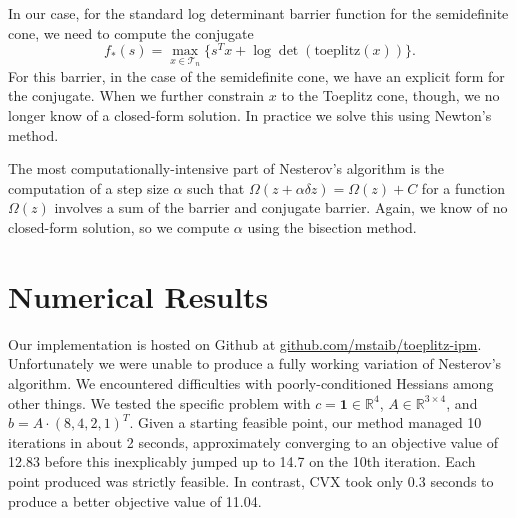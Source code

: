 \documentclass{article}
\begin{document}
In our case, for the standard log determinant barrier function for the semidefinite cone, we need to compute the conjugate
\begin{equation}
f_*(s) = \max_{x \in \mathcal T_n} \{ s^T x + \log\det(\text{toeplitz}(x))\}.
\end{equation}
For this barrier, in the case of the semidefinite cone, we have an explicit
form for the conjugate. When we further constrain $x$ to the Toeplitz cone,
though, we no longer know of a closed-form solution. In practice we solve this
using Newton's method.

The most computationally-intensive part of Nesterov's algorithm is the
computation of a step size $\alpha$ such that $\Omega(z + \alpha \delta z) =
\Omega(z) + C$ for a function $\Omega(z)$ involves a sum of the barrier and
conjugate barrier. Again, we know of no closed-form solution, so we compute
$\alpha$ using the bisection method.


\section{Numerical Results}
Our implementation is hosted on Github at \url{github.com/mstaib/toeplitz-ipm}.
Unfortunately we were unable to produce a fully working variation of Nesterov's
algorithm. We encountered difficulties with poorly-conditioned Hessians among
other things. We tested the specific problem with $c = \mathbf 1 \in \mathbb
R^4$, $A \in \mathbb R^{3\times 4}$, and $b = A \cdot (8,4,2,1)^T$. Given a
starting feasible point, our method managed 10 iterations in about 2 seconds,
approximately converging to an objective value of 12.83 before this
inexplicably jumped up to 14.7 on the 10th iteration. Each point produced was
strictly feasible. In contrast, CVX took only 0.3 seconds to produce a better
objective value of 11.04.
\end{document}
